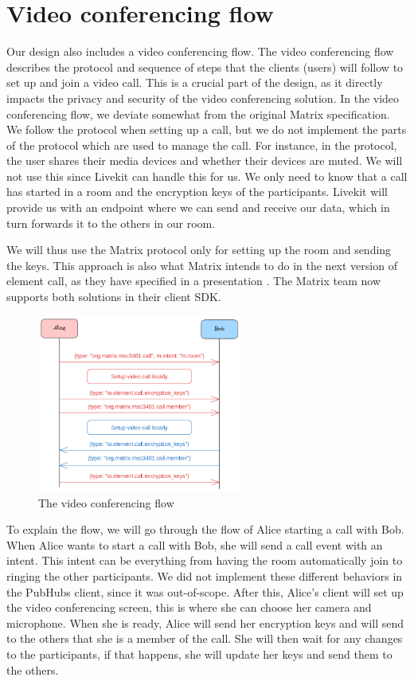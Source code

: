 \documentclass{report}
\begin{document}
\section{Video conferencing flow}
Our design also includes a video conferencing flow. The video conferencing flow describes the protocol and sequence
of steps that the clients (users) will follow to set up and join a video call.
This is a crucial part of the design, as it directly impacts the privacy and security of the video conferencing solution.
In the video conferencing flow, we deviate somewhat from the original Matrix specification. We follow the protocol
when setting up a call, but we do not implement the parts of the protocol which are used to manage the call. For
instance, in the protocol, the user shares their media devices and whether their devices are muted. We will not use
this since Livekit can handle this for us. We only need to know that a call has started in a room and the encryption
keys of the participants. Livekit will provide us with an endpoint where we can send and receive our data, which in
turn forwards it to the others in our room.

We will thus use the Matrix protocol only for setting up the room and sending the keys. This approach is also what
Matrix intends to do in the next version of element call, as they have specified in a presentation \cite{nirve_matrixrtc_nodate}. The
Matrix team now supports both solutions in their client SDK.

\begin{figure}
\centering
\includegraphics[width=0.6\textwidth]{img/Callflow.excalidraw.png}
\caption{The video conferencing flow}
\label{fig:video-conference-flow}
\end{figure}

To explain the flow, we will go through the flow of Alice starting a call with Bob.
When Alice wants to start a call with Bob, she will send a call event with an intent. This intent can be
everything from having the room automatically join to ringing the other participants. We did not implement
these different behaviors in the PubHubs client, since it was out-of-scope. After this, Alice's client will set up the
video conferencing screen, this is where she can choose her camera and microphone. When she is ready, Alice will
send her encryption keys and will send to the others that she is a member of the call. She will then wait for any
changes to the participants, if that happens, she will update her keys and send them to the others.
\end{document}
